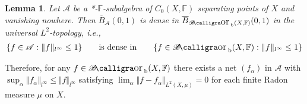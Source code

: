 \documentclass[12pt,b5paper,notitlepage]{article}
\theoremstyle{definition}
\theoremstyle{plain}
\newtheorem{lm}[df]{Lemma}
\DeclareMathOperator{\Borb}{{\mathscr{B}\text{\kern -2pt {\calligra\large or}}\,}_{\mathrm b}}
\newcommand{\ovl}{\overline}
\newcommand{\scr}{\mathscr}
\newcommand{\Fbb}{\mathbb F}
\numberwithin{equation}{section}
\begin{document}
\begin{comment}
The following property is analogous to Thm. \ref{lb155}.

\begin{lm}
Let $(f_\alpha)_{\alpha\in\scr I}$ and $(g_\beta)_{\beta\in\scr J}$ be nets in $\Borb(X)$ converges in the universal $L^2$-topology to $f,g\in\Borb(X)$ respectively. Assume that $\sup_\alpha\Vert f_\alpha\Vert_{l^\infty}<+\infty$. Then $\lim_{(\alpha,\beta)\in\scr I\times\scr J} f_\alpha g_\beta$ converges in the universal $L^2$-topology to $fg$.
\end{lm}

\begin{proof}
Let $M=\Vert g\Vert_{l^\infty}+\sup_\alpha\Vert f_\alpha\Vert_{l^\infty}$. Then for each Radon measure $\mu$ on $X$, we have
\begin{align*}
&\Vert fg-f_\alpha g_\beta\Vert_{L^2(\mu)}\leq \Vert (f-f_\alpha)g\Vert_{L^2(\mu)}+\Vert f_\alpha(g-g_\beta)\Vert_{L^\infty}\\
&\leq M\Vert f-f_\alpha\Vert_{L^2(\mu)}+M\Vert g-g_\beta\Vert_{L^2(\mu)}
\end{align*}
and hence converges to $0$.
\end{proof}
\end{comment}




\begin{lm}\label{lb276}
Let $\scr A$ be a *-$\Fbb$-subalgebra of $C_0(X,\Fbb)$ separating points of $X$ and vanishing nowhere. Then $\ovl B_{\scr A}(0,1)$ is dense in $\ovl B_{\Borb(X,\Fbb)}(0,1)$ in the universal $L^2$-topology, i.e., 
\begin{align*}
\{f\in\scr A:\Vert f\Vert_{l^\infty}\leq1\}\qquad\text{is dense in}\qquad \{f\in\Borb(X,\Fbb):\Vert f\Vert_{l^\infty}\leq1\}
\end{align*}
\end{lm}
Therefore, for any $f\in\Borb(X,\Fbb)$ there exists a net $(f_\alpha)$ in $\scr A$ with $\sup_\alpha\Vert f_\alpha\Vert_{l^\infty}\leq\Vert f\Vert_{l^\infty}$ satisfying $\lim_\alpha\Vert f-f_\alpha\Vert_{L^2(X,\mu)}=0$ for each finite Radon measure $\mu$ on $X$.
\end{document}
